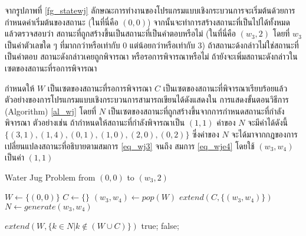 %
%
%
\par{
จากรูปภาพที่ \ref{fg_statewj} 
ลักษณะการทำงานของโปรแกรมแบบเชิงกระบวนการจะเริ่มต้นด้วยการกำหนดค่าเริ่มต้นของสถานะ 
(ในที่นี่คือ $(0,0)$) 
จากนั้นจะทำการสร้างสถานะที่เป็นไปได้ทั้งหมดแล้วตรวจสอบว่า
สถานะที่ถูกสร้างขึ้นเป็นสถานะที่เป็นคำตอบหรือไม่ 
(ในที่นี่คือ $(w_3,2)$ โดยที่ $w_3$ เป็นค่าตัวเลขใด ๆ 
ที่มากกว่าหรือเท่ากับ 0 แต่น้อยกว่าหรือเท่ากับ 3)
ถ้าสถานะด้งกล่าวไม่ใช่สถานะที่เป็นคำตอบ สถานะดังกล่าวเคยถูกพิจารณา 
หรือรอการพิจารณาหรือไม่
ถ้ายังจะเพิ่มสถานะดังกล่าวในเซตของสถานะที่รอการพิจารณา
}
%
\par{
กำหนดให้ $W$ เป็นเซตของสถานะที่รอการพิจารณา $C$ เป็นเซตของสถานะที่พิจารณาเรียบร้อยแล้ว
ตัวอย่างของการโปรแกรมแบบเชิงกระบวนการสามารถเขียนได้ดังแสดงใน 
การแสดงขั้นตอนวิธีการ (Algorithm) \ref{al_wj}
โดยที่ $N$ เป็นเซตของสถานะที่ถูกสร้างขึ้นจากการกำหนดสถานะที่กำลังพิจารณา 
ตัวอย่างเช่น ถ้ากำหนดให้สถานะที่กำลังพิจารณาเป็น $(1,1)$
ค่าของ $N$ จะมีค่าได้ดังนี้ $\{(3,1),(1,4),(0,1),(1,0),(2,0),(0,2)\}$
ซึ่งค่าของ $N$ จะได้มาจากกฎของการเปลี่ยนแปลงสถานะที่อธิบายตามสมการ \ref{eq_wj3}
จนถึง สมการ \ref{eq_wje4} โดยใช้ $(w_3,w_4)$ เป็นค่า $(1,1)$
}
%

\begin{algorithm}
\lmr
\caption{Water Jug Problem from $(0,0)$ to $(w_3,2)$ \label{al_wj} }
\begin{algorithmic}[1]
\State $\textit{W} \gets \{(0,0)\}$
\State $\textit{C} \gets \{\}$
\Repeat
  \State $(w_3,w_4) \gets pop(W)$
  \State $\textit{extend}(C,\{(w_3,w_4)\})$
  \State $N \gets \textit{generate}(w_3,w_4)$
  
  \State $\textit{extend}(W,\{k \in N | k \notin (W \cup C) \})$
\State \Return true;
\EndIf
\State \Return false;
\EndFunction
\end{algorithmic}
\end{algorithm}

